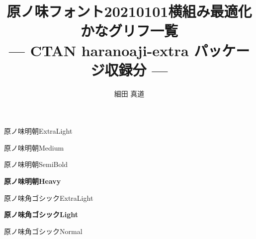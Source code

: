 \documentclass[dvipdfmx]{jsarticle}
\title{原ノ味フォント20210101横組み最適化かなグリフ一覧\\
--- CTAN haranoaji-extra パッケージ収録分 ---}
\author{細田 真道}
\begin{document}
\maketitle
{}

\clearpage
\parindent=0pt
\fboxsep=0pt

\mcfamily\ltseries
{\huge 原ノ味明朝\textmd{ExtraLight}}

\testAll

\clearpage

\mcfamily\mdseries
{\huge 原ノ味明朝\textmd{Medium}}

\testAll

\clearpage

\mgfamily %
{\huge 原ノ味明朝\textmd{SemiBold}}

\testAll

\clearpage

\mcfamily\bfseries
{\huge 原ノ味明朝\textmd{Heavy}}

\testAll

\clearpage

\gtfamily\mdseries
{\huge 原ノ味角ゴシック\textmd{ExtraLight}}

\testAll

\clearpage

\gtfamily\bfseries
{\huge 原ノ味角ゴシック\textmd{Light}}

\testAll

\clearpage

\gtfamily\ebseries
{\huge 原ノ味角ゴシック\textmd{Normal}}

\testAll
\end{document}

